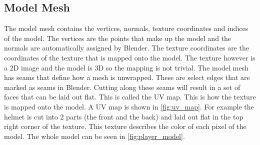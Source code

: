 \subsection{Model Mesh} \label{sec:theory_theory_models_animation}
The model mesh contains the vertices, normals, texture coordinates and indices of the model.
The vertices are the points that make up the model and the normals are automatically assigned by Blender.
The texture coordinates are the coordinates of the texture that is mapped onto the model.
The texture however is a 2D image and the model is 3D so the mapping is not trivial.
The model mesh has seams that define how a mesh is unwrapped.
These are select edges that are marked as seams in Blender.
Cutting along these seams will result in a set of faces that can be laid out flat.
This is called the UV map.
This is how the texture is mapped onto the model.
A UV map is shown in \autoref{fig:uv_map}.
For example the helmet is cut into 2 parts (the front and the back) and laid out flat in the top right corner of the texture.
This texture describes the color of each pixel of the model.
The whole model can be seen in \autoref{fig:player_model}.

